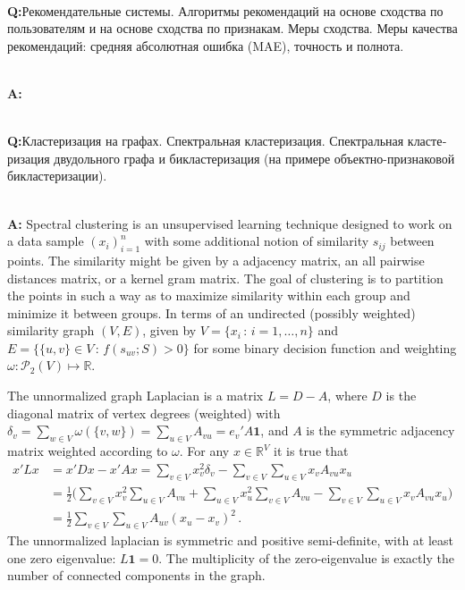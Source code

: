 \documentclass[a4paper,14pt]{extarticle}
\newcommand{\Real}{\mathbb{R}}
\newcommand{\one}{\mathbf{1}}
\newcommand{\rus}[1]{\foreignlanguage{russian}{#1}}
\begin{document}
\hfill\\\textbf{Q:}\rus{Рекомендательные системы. Алгоритмы рекомендаций на основе
сходства по пользователям и на основе сходства по признакам. Меры сходства. Меры
качества рекомендаций: средняя абсолютная ошибка (MAE), точность и полнота.}

\hfill\\\textbf{A:}

\hfill\\\textbf{Q:}\rus{Кластеризация на графах. Спектральная кластеризация. Спектральная
кластеризация двудольного графа и бикластеризация (на примере объектно-признаковой
бикластеризации).}

\hfill\\\textbf{A:}
Spectral clustering is an unsupervised learning technique designed to work on a data
sample $(x_i)_{i=1}^n$ with some additional notion of similarity $s_{ij}$ between
points. The similarity might be given by a adjacency matrix, an all pairwise distances
matrix, or a kernel gram matrix. The goal of clustering is to partition the points
in such a way as to maximize similarity within each group and minimize it between
groups. In terms of an undirected (possibly weighted) similarity graph $(V, E)$,
given by $V = \{x_i \,:\, i=1,\ldots, n\}$ and $E = \{\{u, v\}\in V\,:\, f(s_{uv}; S) > 0\}$
for some binary decision function and weighting $\omega:\mathcal{P}_2(V)\mapsto
\Real$.

The unnormalized graph Laplacian is a matrix $L = D - A$, where $D$ is the diagonal
matrix of vertex degrees (weighted) with $\delta_v = \sum_{w\in V} \omega(\{v, w\})
= \sum_{u\in V} A_{vu} = e_v' A \one$, and $A$ is the symmetric adjacency matrix
weighted according to $\omega$. For any $x\in\Real^V$ it is true that
\begin{align*}
x' L x
    &= x' D x - x' A x = \sum_{v\in V} x_v^2 \delta_v
     - \sum_{v\in V} \sum_{u\in V} x_v A_{vu} x_u \\
    &= \frac{1}{2}\bigl(\sum_{v\in V} x_v^2 \sum_{u\in V} A_{vu} 
     + \sum_{u\in V} x_u^2 \sum_{v\in V} A_{vu}
     - \sum_{v\in V} \sum_{u\in V} x_v A_{vu} x_u \bigr)\\
    &= \frac{1}{2} \sum_{v\in V} \sum_{u\in V} A_{uv} (x_u - x_v)^2 \,.
\end{align*}
The unnormalized laplacian is symmetric and positive semi-definite, with at least
one zero eigenvalue: $L\one = 0$. The multiplicity of the zero-eigenvalue is exactly
the number of connected components in the graph.
\end{document}

